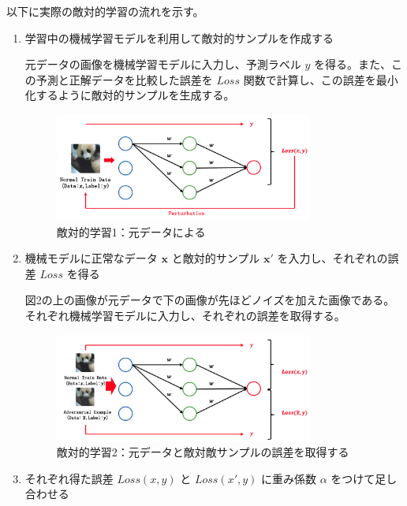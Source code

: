 以下に実際の敵対的学習の流れを示す。\cite{AdversarialTraining}
\begin{enumerate}

    \item 学習中の機械学習モデルを利用して敵対的サンプルを作成する

    元データの画像を機械学習モデルに入力し、予測ラベル $y$ を得る。また、この予測と正解データを比較した誤差を $Loss$ 関数で計算し、この誤差を最小化するように敵対的サンプルを生成する。
    
    \begin{figure}[h]
        \centering
        \includegraphics[width=0.8\textwidth]{images/敵対的学習1.png}
        \caption{敵対的学習1：元データによる}
        \label{fig:adversarial_learning1}
    \end{figure}
    
    \item 機械モデルに正常なデータ $\bm{x}$ と敵対的サンプル $\bm{x}'$ を入力し、それぞれの誤差 $Loss$ を得る

    図2の上の画像が元データで下の画像が先ほどノイズを加えた画像である。それぞれ機械学習モデルに入力し、それぞれの誤差を取得する。

    \begin{figure}[h]
        \centering
        \includegraphics[width=0.8\textwidth]{images/敵対的学習2.png}
        \caption{敵対的学習2：元データと敵対敵サンプルの誤差を取得する}
        \label{fig:adversarial_learning2}
    \end{figure}

    \item それぞれ得た誤差 $Loss(x, y)$ と $Loss(x', y)$ に重み係数 $\alpha$ をつけて足し合わせる


\end{enumerate}
